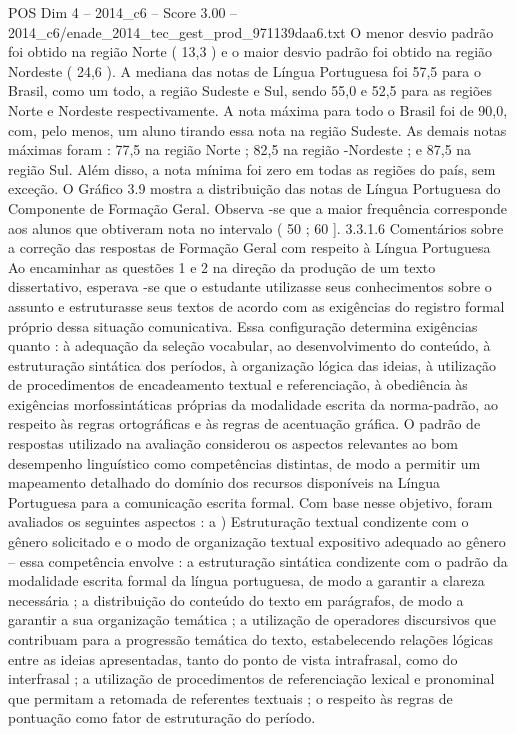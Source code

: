 \begin{textsample}{POS Dim 4 – 2014\_c6 – Score 3.00 – 2014\_c6/enade\_2014\_tec\_gest\_prod\_971139daa6.txt}
O menor desvio padrão foi obtido na região Norte ( 13,3 ) e o maior desvio padrão foi obtido na região Nordeste ( 24,6 ).
A mediana das notas de Língua Portuguesa foi 57,5 para o Brasil, como um todo, a região Sudeste e Sul, sendo 55,0 e 52,5 para as regiões Norte e Nordeste respectivamente.
A nota máxima para todo o Brasil foi de 90,0, com, pelo menos, um aluno tirando essa nota na região Sudeste.
As demais notas máximas foram : 77,5 na região Norte ; 82,5 na região -Nordeste ; e 87,5 na região Sul.
Além disso, a nota mínima foi zero em todas as regiões do país, sem exceção.
O Gráfico 3.9 mostra a distribuição das notas de Língua Portuguesa do Componente de Formação Geral.
Observa -se que a maior frequência corresponde aos alunos que obtiveram nota no intervalo ( 50 ; 60 ]. 3.3.1.6 Comentários sobre a correção das respostas de Formação Geral com respeito à Língua Portuguesa Ao encaminhar as questões 1 e 2 na direção da produção de um texto dissertativo, esperava -se que o estudante utilizasse seus conhecimentos sobre o assunto e estruturasse seus textos de acordo com as exigências do registro formal próprio dessa situação comunicativa.
Essa configuração determina exigências quanto : à adequação da seleção vocabular, ao desenvolvimento do conteúdo, à estruturação sintática dos períodos, à organização lógica das ideias, à utilização de procedimentos de encadeamento textual e referenciação, à obediência às exigências morfossintáticas próprias da modalidade escrita da norma-padrão, ao respeito às regras ortográficas e às regras de acentuação gráfica.
O padrão de respostas utilizado na avaliação considerou os aspectos relevantes ao bom desempenho linguístico como competências distintas, de modo a permitir um mapeamento detalhado do domínio dos recursos disponíveis na Língua Portuguesa para a comunicação escrita formal.
Com base nesse objetivo, foram avaliados os seguintes aspectos : a ) Estruturação textual condizente com o gênero solicitado e o modo de organização textual expositivo adequado ao gênero – essa competência envolve : a estruturação sintática condizente com o padrão da modalidade escrita formal da língua portuguesa, de modo a garantir a clareza necessária ; a distribuição do conteúdo do texto em parágrafos, de modo a garantir a sua organização temática ; a utilização de operadores discursivos que contribuam para a progressão temática do texto, estabelecendo relações lógicas entre as ideias apresentadas, tanto do ponto de vista intrafrasal, como do interfrasal ; a utilização de procedimentos de referenciação lexical e pronominal que permitam a retomada de referentes textuais ; o respeito às regras de pontuação como fator de estruturação do período.

\end{textsample}
